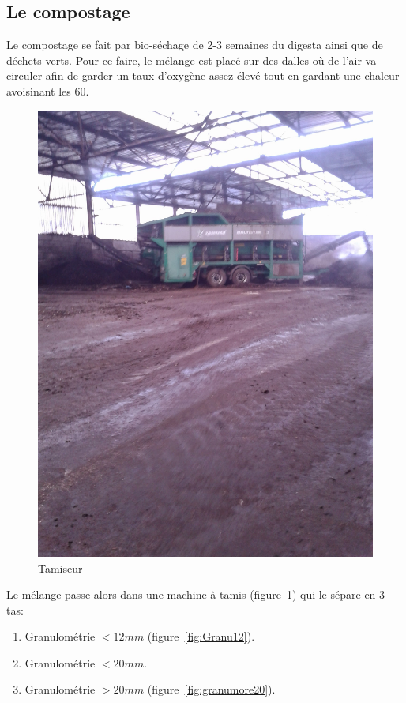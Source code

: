\documentclass{article}
\begin{document}
\subsection{Le compostage}
Le compostage se fait par bio-séchage de 2-3 semaines du digesta ainsi que de déchets verts. Pour ce faire, le mélange est placé sur des dalles où de l'air va circuler afin de garder un taux d'oxygène assez élevé tout en gardant une chaleur avoisinant les \unit{60}{\celsius}.
\begin{figure}
  \centering
  \includegraphics[scale=0.07]{IMG_20141105_102726.jpg}
  \caption{Tamiseur}
  \label{fig:tamiseur}
\end{figure}
Le mélange passe alors dans une machine à tamis (figure~\ref{fig:tamiseur}) qui le sépare en 3 tas:
\begin{enumerate}
\item Granulométrie $< \unit{12}{mm}$ (figure~\ref{fig:Granu12}).
\item Granulométrie $< \unit{20}{mm}$.
\item Granulométrie $> \unit{20}{mm}$ (figure~\ref{fig:granumore20}).
\end{enumerate}
\end{document}

